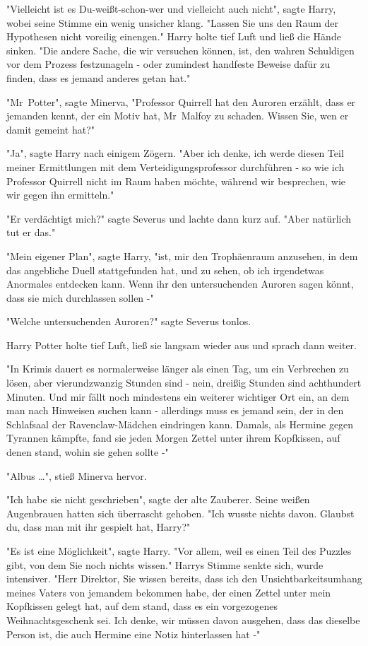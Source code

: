 {"Vielleicht ist es Du-weißt-schon-wer und vielleicht auch nicht", sagte Harry, wobei seine Stimme ein wenig unsicher klang. "Lassen Sie uns den Raum der Hypothesen nicht voreilig einengen." Harry holte tief Luft und ließ die Hände sinken. "Die andere Sache, die wir versuchen können, ist, den wahren Schuldigen vor dem Prozess festzunageln - oder zumindest handfeste Beweise dafür zu finden, dass es jemand anderes getan hat."

"Mr~Potter", sagte Minerva, "Professor Quirrell hat den Auroren erzählt, dass er jemanden kennt, der ein Motiv hat, Mr~Malfoy zu schaden. Wissen Sie, wen er damit gemeint hat?"

"Ja", sagte Harry nach einigem Zögern. "Aber ich denke, ich werde diesen Teil meiner Ermittlungen mit dem Verteidigungsprofessor durchführen - so wie ich Professor Quirrell nicht im Raum haben möchte, während wir besprechen, wie wir gegen ihn ermitteln."

"Er verdächtigt mich?" sagte Severus und lachte dann kurz auf. "Aber natürlich tut er das."

"Mein eigener Plan", sagte Harry, "ist, mir den Trophäenraum anzusehen, in dem das angebliche Duell stattgefunden hat, und zu sehen, ob ich irgendetwas Anormales entdecken kann. Wenn ihr den untersuchenden Auroren sagen könnt, dass sie mich durchlassen sollen -"

"Welche untersuchenden Auroren?" sagte Severus tonlos.

Harry Potter holte tief Luft, ließ sie langsam wieder aus und sprach dann weiter.

"In Krimis dauert es normalerweise länger als einen Tag, um ein Verbrechen zu lösen, aber vierundzwanzig Stunden sind - nein, dreißig Stunden sind achthundert Minuten. Und mir fällt noch mindestens ein weiterer wichtiger Ort ein, an dem man nach Hinweisen suchen kann - allerdings muss es jemand sein, der in den Schlafsaal der Ravenclaw-Mädchen eindringen kann. Damals, als Hermine gegen Tyrannen kämpfte, fand sie jeden Morgen Zettel unter ihrem Kopfkissen, auf denen stand, wohin sie gehen sollte -"

"Albus …", stieß Minerva hervor.

"Ich habe sie nicht geschrieben", sagte der alte Zauberer. Seine weißen Augenbrauen hatten sich überrascht gehoben. "Ich wusste nichts davon. Glaubst du, dass man mit ihr gespielt hat, Harry?"

"Es ist eine Möglichkeit", sagte Harry. "Vor allem, weil es einen Teil des Puzzles gibt, von dem Sie noch nichts wissen." Harrys Stimme senkte sich, wurde intensiver. "Herr Direktor, Sie wissen bereits, dass ich den Unsichtbarkeitsumhang meines Vaters von jemandem bekommen habe, der einen Zettel unter mein Kopfkissen gelegt hat, auf dem stand, dass es ein vorgezogenes Weihnachtsgeschenk sei. Ich denke, wir müssen davon ausgehen, dass das dieselbe Person ist, die auch Hermine eine Notiz hinterlassen hat -"

}
